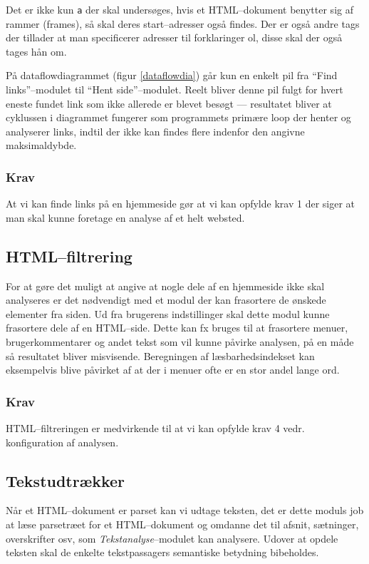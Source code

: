 \documentclass[a4paper,oneside]{memoir}
\begin{document}
Det er ikke kun \texttt{a} der skal undersøges, hvis et HTML--dokument
benytter sig af rammer (frames), så skal deres start--adresser også
findes. Der er også andre tags der tillader at man specificerer
adresser til forklaringer ol, disse skal der også tages hån om.

  På dataflowdiagrammet (figur \ref{dataflowdia}) går kun en enkelt pil fra
``Find links''--modulet til ``Hent side''--modulet. Reelt bliver denne pil fulgt
for hvert eneste
fundet link som ikke allerede er blevet besøgt --- resultatet bliver at
cyklussen i diagrammet fungerer som programmets primære loop der
henter og analyserer links, indtil der ikke kan findes flere indenfor
den angivne maksimaldybde.

\subsubsection{Krav}
At vi kan finde links på en hjemmeside gør at vi kan opfylde krav 1
der siger at man skal kunne foretage en analyse af et helt websted.

\subsection{HTML--filtrering}
For at gøre det muligt at angive at nogle dele af en hjemmeside ikke
skal analyseres er det nødvendigt med et modul der kan frasortere de
ønskede elementer fra siden. Ud fra brugerens indstillinger skal dette
modul kunne frasortere dele af en HTML--side. Dette kan fx bruges
til at frasortere menuer, brugerkommentarer og andet tekst som vil
kunne påvirke analysen, på en måde så resultatet bliver
misvisende. Beregningen af læsbarhedsindekset kan eksempelvis blive
påvirket af at der i menuer ofte er en stor andel lange ord.

\subsubsection{Krav}
HTML--filtreringen er medvirkende til at vi kan opfylde krav 4
vedr. konfiguration af analysen.

\subsection{Tekstudtrækker}
\label{tekstudtraekkerdesign}
Når et HTML--dokument er parset kan vi udtage teksten, det er dette
moduls job at læse parsetræet for et HTML--dokument og omdanne det til
afsnit, sætninger, overskrifter osv, som \textit{Tekstanalyse}--modulet
kan analysere. Udover at opdele teksten skal de enkelte tekstpassagers
semantiske betydning bibeholdes.
\end{document}
